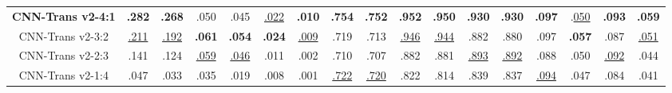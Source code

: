 \begin{table}[t]
{\begin{tabular}{@{} p{0.9cm} p{0.55cm} p{0.55cm} p{0.55cm} p{0.55cm} p{0.55cm} p{0.55cm} p{0.55cm} p{0.55cm} p{0.55cm} p{0.55cm} p{0.55cm} p{0.55cm} p{0.55cm} p{0.52cm} p{0.52cm} p{0.52cm} p{0.52cm} @{}}
\multicolumn{2}{c}{\textbf{CNN-Trans v2-4:1}} 
  & \multicolumn{1}{c}{{\textbf{.282}}} 
  & \multicolumn{1}{c}{{\textbf{.268}}} 
  & \multicolumn{1}{c}{.050} 
  & \multicolumn{1}{c}{.045} 
  & \multicolumn{1}{c}{{\underline{.022}}} 
  & \multicolumn{1}{c}{{\textbf{.010}}} 
  & \multicolumn{1}{c}{{\textbf{.754}} }
  & \multicolumn{1}{c}{{\textbf{.752}} }
  & \multicolumn{1}{c}{{\textbf{.952}} }
  & \multicolumn{1}{c}{{\textbf{.950}} }
  & \multicolumn{1}{c}{{\textbf{.930}} }
  & \multicolumn{1}{c}{{\textbf{.930}} }
  & \multicolumn{1}{c}{{\textbf{.097}} }
  & \multicolumn{1}{c}{.{\underline{050}}} 
  & \multicolumn{1}{c}{{\textbf{.093}}} 
  & \multicolumn{1}{c}{{\textbf{.059}}} \\ 
\multicolumn{2}{c}{CNN-Trans v2-3:2} 
  & \multicolumn{1}{c}{{\underline{.211}}} 
  & \multicolumn{1}{c}{{\underline{.192}}} 
  & \multicolumn{1}{c}{{\textbf{.061}}} 
  & \multicolumn{1}{c}{{\textbf{.054}}} 
  & \multicolumn{1}{c}{{\textbf{.024}}} 
  & \multicolumn{1}{c}{{\underline{.009}}} 
  & \multicolumn{1}{c}{.719} 
  & \multicolumn{1}{c}{.713} 
  & \multicolumn{1}{c}{{\underline{.946}}} 
  & \multicolumn{1}{c}{{\underline{.944}}} 
  & \multicolumn{1}{c}{.882} 
  & \multicolumn{1}{c}{.880} 
  & \multicolumn{1}{c}{.097}
  & \multicolumn{1}{c}{{\textbf{.057}}} 
  & \multicolumn{1}{c}{.087} 
  & \multicolumn{1}{c}{{\underline{.051}}} \\ 
\multicolumn{2}{c}{CNN-Trans v2-2:3} 
  & \multicolumn{1}{c}{.141} 
  & \multicolumn{1}{c}{.124} 
  & \multicolumn{1}{c}{{\underline{.059}}} 
  & \multicolumn{1}{c}{{\underline{.046}}} 
  & \multicolumn{1}{c}{.011} 
  & \multicolumn{1}{c}{.002} 
  & \multicolumn{1}{c}{.710} 
  & \multicolumn{1}{c}{.707} 
  & \multicolumn{1}{c}{.882} 
  & \multicolumn{1}{c}{.881} 
  & \multicolumn{1}{c}{{\underline{.893}}} 
  & \multicolumn{1}{c}{{\underline{.892}}} 
  & \multicolumn{1}{c}{.088} 
  & \multicolumn{1}{c}{.050} 
  & \multicolumn{1}{c}{{\underline{.092}}} 
  & \multicolumn{1}{c}{.044} \\ 
\multicolumn{2}{c}{CNN-Trans v2-1:4} 
  & \multicolumn{1}{c}{.047} 
  & \multicolumn{1}{c}{.033} 
  & \multicolumn{1}{c}{.035} 
  & \multicolumn{1}{c}{.019} 
  & \multicolumn{1}{c}{.008} 
  & \multicolumn{1}{c}{.001} 
  & \multicolumn{1}{c}{{\underline{.722}}} 
  & \multicolumn{1}{c}{{\underline{.720}}} 
  & \multicolumn{1}{c}{.822} 
  & \multicolumn{1}{c}{.814} 
  & \multicolumn{1}{c}{.839} 
  & \multicolumn{1}{c}{.837} 
  & \multicolumn{1}{c}{{\underline{.094}}} 
  & \multicolumn{1}{c}{.047} 
  & \multicolumn{1}{c}{.084} 
  & \multicolumn{1}{c}{.041} \\ 
\midrule


\end{tabular}}
\end{table}
